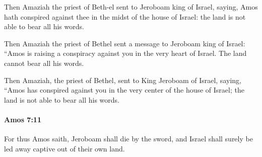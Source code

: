 			\begin{versebox}
					\item[BHS] 
					\item[LXX] 
					\item[ASV] Then Amaziah the priest of Beth-el sent to Jeroboam king of Israel, saying, Amos hath conspired against thee in the midst of the house of Israel: the land is not able to bear all his words.
					\item[NIV] Then Amaziah the priest of Bethel sent a message to Jeroboam king of Israel: “Amos is raising a conspiracy against you in the very heart of Israel. The land cannot bear all his words.
					\item[NRSV] Then Amaziah, the priest of Bethel, sent to King Jeroboam of Israel, saying, “Amos has conspired against you in the very center of the house of Israel; the land is not able to bear all his words.
			\end{versebox}

		\paragraph{Amos 7:11} %
			\label{AMOS-7-11}

			For thus Amos saith, Jeroboam shall die by the sword, and Israel shall surely be led away captive out of their own land.

